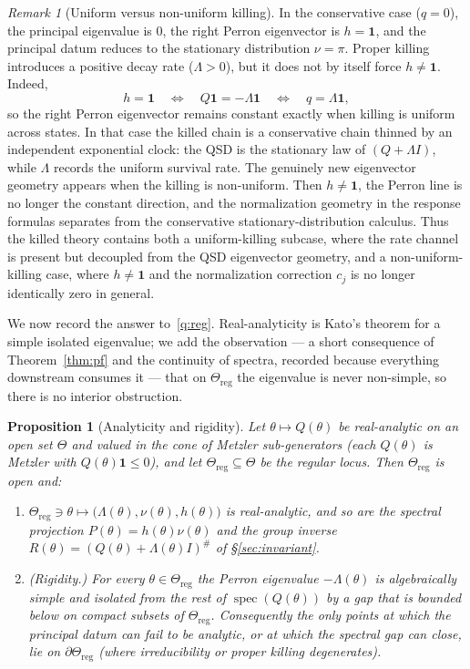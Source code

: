 \documentclass[11pt,reqno]{amsart}
\theoremstyle{plain}
\newtheorem{proposition}[theorem]{Proposition}
\theoremstyle{definition}
\theoremstyle{remark}
\newtheorem{remark}[theorem]{Remark}
\newcommand{\Reg}{\Theta_{\mathrm{reg}}}
\newcommand{\one}{\mathbf{1}}
\DeclareMathOperator{\spec}{spec}
\begin{document}
\begin{remark}[Uniform versus non-uniform killing]\label{rem:uniform-killing}
In the conservative case ($q=0$), the principal eigenvalue is $0$, the right Perron
eigenvector is $h=\one$, and the principal datum reduces to the stationary
distribution $\nu=\pi$. Proper killing introduces a positive decay rate
($\Lambda>0$), but it does not by itself force $h\neq\one$. Indeed,
\[
h=\one
\quad\Longleftrightarrow\quad
Q\one=-\Lambda\one
\quad\Longleftrightarrow\quad
q=\Lambda\one,
\]
so the right Perron eigenvector remains constant exactly when killing is uniform
across states. In that case the killed chain is a conservative chain thinned by an
independent exponential clock: the QSD is the stationary law of $(Q+\Lambda I)$,
while $\Lambda$ records the uniform survival rate.
The genuinely new eigenvector geometry appears when the killing is non-uniform.
Then $h\neq\one$, the Perron line is no longer the constant direction, and the
normalization geometry in the response formulas separates from the conservative
stationary-distribution calculus. Thus the killed theory contains both a
uniform-killing subcase, where the rate channel is present but decoupled from the
QSD eigenvector geometry, and a non-uniform-killing case, where $h\neq\one$ and the
normalization correction $c_j$ is no longer identically zero in general.
\end{remark}

We now record the answer to~\ref{q:reg}. Real-analyticity is Kato's theorem for a
simple isolated eigenvalue; we add the observation --- a short consequence of
Theorem~\ref{thm:pf} and the continuity of spectra, recorded because everything
downstream consumes it --- that on $\Reg$ the eigenvalue is never non-simple, so
there is no interior obstruction.

\begin{proposition}[Analyticity and rigidity]\label{thm:rigidity}
Let $\theta\mapsto Q(\theta)$ be real-analytic on an open set $\Theta$ and valued in
the cone of Metzler sub-generators (each $Q(\theta)$ is Metzler with
$Q(\theta)\one\le 0$), and let $\Reg\subseteq\Theta$ be the regular locus. Then
$\Reg$ is open and:
\begin{enumerate}[label=\textup{(\roman*)}]
\item $\Reg\ni\theta\mapsto\bigl(\Lambda(\theta),\nu(\theta),h(\theta)\bigr)$ is
real-analytic, and so are the spectral projection $P(\theta)=h(\theta)\nu(\theta)$
and the group inverse $R(\theta)=(Q(\theta)+\Lambda(\theta)I)^{\#}$ of
\S\ref{sec:invariant}.
\item \textup{(Rigidity.)} For every $\theta\in\Reg$ the Perron eigenvalue
$-\Lambda(\theta)$ is algebraically simple and isolated from the rest of
$\spec(Q(\theta))$ by a gap that is bounded below on compact subsets of $\Reg$.
Consequently the only points at which the principal datum can fail to be analytic,
or at which the spectral gap can close, lie on $\partial\Reg$ \textup{(}where
irreducibility or proper killing degenerates\textup{)}.
\end{enumerate}
\end{proposition}
\end{document}
